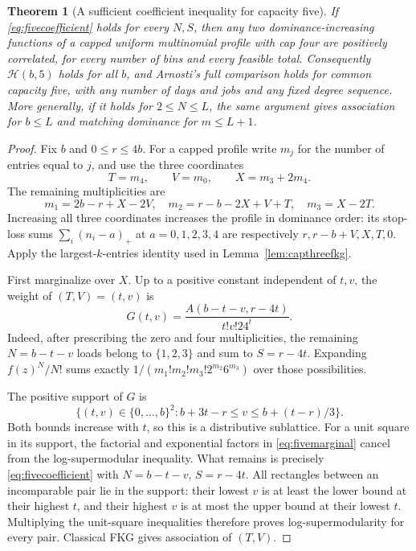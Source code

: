 \documentclass[11pt]{article}
\newtheorem{theorem}{Theorem}
\begin{document}
\begin{theorem}[A sufficient coefficient inequality for capacity five]\label{thm:fiveconditional}
If \eqref{eq:fivecoefficient} holds for every $N,S$, then any two
dominance-increasing functions of a capped uniform multinomial profile
with cap four are positively correlated, for every number of bins and
every feasible total. Consequently $\mathcal H(b,5)$ holds for all $b$,
and Arnosti's full comparison holds for common capacity five, with any
number of days and jobs and any fixed degree sequence.
More generally, if it holds for $2\leq N\leq L$, the same argument
gives association for $b\leq L$ and matching dominance for $m\leq L+1$.
\end{theorem}
\begin{proof}
Fix $b$ and $0\leq r\leq4b$. For a capped profile write $m_j$ for
the number of entries equal to $j$, and use the three coordinates
\[
 T=m_4,\qquad V=m_0,\qquad X=m_3+2m_4.
\]
The remaining multiplicities are
\begin{equation}\label{eq:fivecounts}
 m_1=2b-r+X-2V,\quad m_2=r-b-2X+V+T,\quad m_3=X-2T.
\end{equation}
Increasing all three coordinates increases the profile in dominance
order: its stop-loss sums $\sum_i(n_i-a)_+$ at $a=0,1,2,3,4$
are respectively $r,r-b+V,X,T,0$. Apply the largest-$k$-entries
identity used in Lemma~\ref{lem:capthreefkg}.

First marginalize over $X$. Up to a positive constant independent
of $t,v$, the weight of $(T,V)=(t,v)$ is
\begin{equation}\label{eq:fivemarginal}
 G(t,v)=\frac{A(b-t-v,r-4t)}{t!v!24^t}.
\end{equation}
Indeed, after prescribing the zero and four multiplicities, the
remaining $N=b-t-v$ loads belong to $\{1,2,3\}$ and sum to
$S=r-4t$. Expanding $f(z)^N/N!$ sums exactly
$1/(m_1!m_2!m_3!2^{m_2}6^{m_3})$ over those possibilities.

The positive support of $G$ is
\[
 \{(t,v)\in\{0,\ldots,b\}^2:
       b+3t-r\leq v\leq b+(t-r)/3\}.
\]
Both bounds increase with $t$, so this is a distributive sublattice.
For a unit square in its support, the factorial and exponential
factors in \eqref{eq:fivemarginal} cancel from the log-supermodular
inequality. What remains is precisely \eqref{eq:fivecoefficient}
with $N=b-t-v$, $S=r-4t$. All rectangles between an incomparable
pair lie in the support: their lowest $v$ is at least the lower
bound at their highest $t$, and their highest $v$ is at most the
upper bound at their lowest $t$. Multiplying the unit-square
inequalities therefore proves log-supermodularity for every pair.
Classical FKG gives association of $(T,V)$.


\end{proof}
\end{document}
